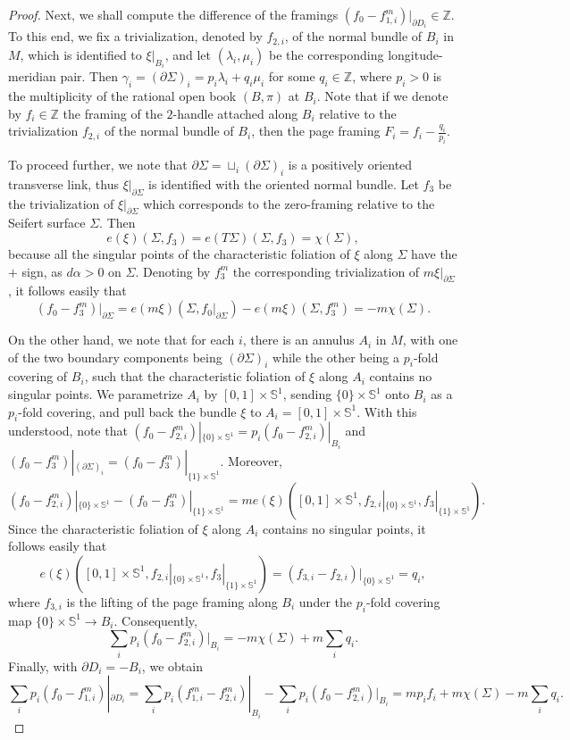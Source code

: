 \documentclass[11pt]{amsart}
\theoremstyle{plain}
\numberwithin{theorem}{section}
\theoremstyle{definition}
\newcommand{\Z}{{\mathbb Z}}
\newcommand{\s}{{\mathbb S}}
\begin{document}
\begin{proof}
Next, we shall compute the difference of the framings $(f_0-f_{1,i}^m)|_{\partial D_i}\in\Z$. To this end,
we fix a trivialization, denoted by $f_{2,i}$, of the normal bundle of $B_i$ in $M$, which is identified to
$\xi|_{B_i}$, and let $(\lambda_i,\mu_i)$ be the corresponding longitude-meridian pair. Then 
$\gamma_i=(\partial \Sigma)_i=p_i\lambda_i+q_i\mu_i$ for some $q_i\in \Z$, where
$p_i>0$ is the multiplicity of the rational open book $(B,\pi)$ at $B_i$. 
Note that if we denote by $f_i\in\Z$ the framing of the $2$-handle attached along $B_i$ relative to the trivialization $f_{2,i}$ 
of the normal bundle of $B_i$, then the page framing $F_i=f_i-\frac{q_i}{p_i}$. 

To proceed further, we note that $\partial \Sigma=\sqcup_i (\partial \Sigma)_i$ is a positively oriented transverse link, thus $\xi|_{\partial \Sigma}$ is identified with the oriented normal bundle. Let $f_3$ be the trivialization of $\xi|_{\partial \Sigma}$ which corresponds to the zero-framing relative to the Seifert surface $\Sigma$.
Then 
$$
e(\xi)(\Sigma,f_3)=e(T\Sigma)(\Sigma,f_3)=\chi(\Sigma),
$$
because all the singular points of the characteristic foliation of $\xi$ along $\Sigma$ have the $+$ sign, 
as $d\alpha>0$ on $\Sigma$. Denoting by $f_3^m$ the corresponding trivialization of 
$m\xi|_{\partial \Sigma}$, it follows easily that 
$$
(f_0-f_3^m)|_{\partial \Sigma}=e(m\xi)(\Sigma,f_0|_{\partial \Sigma})-e(m\xi)(\Sigma, f_3^m)=-m\chi(\Sigma).
$$

On the other hand, we note that for each $i$, there is an annulus $A_i$ in $M$, with one of the two boundary components being $(\partial \Sigma)_i$ while the other being a $p_i$-fold covering of $B_i$, such that the characteristic foliation of $\xi$ along $A_i$ contains no singular points. 
We parametrize $A_i$ by $[0,1]\times \s^1$, sending $\{0\}\times \s^1$ onto $B_i$ as a 
$p_i$-fold covering, and pull back the bundle $\xi$ to $A_i=[0,1]\times \s^1$. With this understood, note that $(f_0-f_{2,i}^m)|_{\{0\}\times \s^1}=p_i (f_0-f_{2,i}^m)|_{B_i}$ and
$(f_0-f_3^m)|_{(\partial \Sigma)_i}=(f_0-f_3^m)|_{\{1\}\times \s^1}$. Moreover, 
$$
(f_0-f_{2,i}^m)|_{\{0\}\times \s^1}-(f_0-f_3^m)|_{\{1\}\times \s^1}=
m e(\xi)([0,1]\times \s^1,f_{2,i}|_{\{0\}\times \s^1}, f_3|_{\{1\}\times \s^1}).
$$
Since the characteristic foliation of $\xi$ along $A_i$ contains no singular points, it follows easily
that 
$$
e(\xi)([0,1]\times \s^1,f_{2,i}|_{\{0\}\times \s^1}, f_3|_{\{1\}\times \s^1})
=(f_{3,i}-f_{2,i})|_{\{0\}\times \s^1}=q_i,
$$
where $f_{3,i}$ is the lifting of the page framing along $B_i$ under the $p_i$-fold covering map 
$\{0\}\times \s^1\rightarrow B_i$. Consequently,
$$
\sum_i p_i (f_0-f_{2,i}^m)|_{B_i}=-m \chi(\Sigma)+m\sum_i q_i.
$$
Finally, with $\partial D_i=-B_i$, we obtain
$$
\sum_i p_i(f_0-f_{1,i}^m)|_{\partial D_i}
=\sum_i p_i (f_{1,i}^m-f_{2,i}^m)|_{B_i}-\sum_i p_i (f_0-f_{2,i}^m)|_{B_i}=mp_i f_i+m\chi(\Sigma)-
m\sum_i q_i.
$$


\end{proof}
\end{document}
